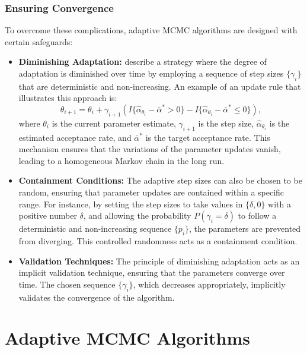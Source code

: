 \documentclass{article}
\begin{document}
\subsubsection{Ensuring Convergence}
To overcome these complications, adaptive MCMC algorithms are designed with certain safeguards:
\begin{itemize}
\item \textbf{Diminishing Adaptation:} \cite{andrieu_tutorial_2008} describe a strategy where the degree of adaptation is diminished over time by employing a sequence of step sizes \(\{ \gamma_i \}\) that are deterministic and non-increasing. An example of an update rule that illustrates this approach is:
\begin{equation*}
    \theta_{i+1} = \theta_{i} + \gamma_{i+1} \left( I\{\hat{\alpha}_{\theta_i} - \bar{\alpha}^* > 0\} - I\{\hat{\alpha}_{\theta_i} - \bar{\alpha}^* \leq 0\} \right),
\end{equation*}
where \(\theta_i\) is the current parameter estimate, \(\gamma_{i+1}\) is the step size, \(\hat{\alpha}_{\theta_i}\) is the estimated acceptance rate, and \(\bar{\alpha}^*\) is the target acceptance rate. This mechanism ensures that the variations of the parameter updates vanish, leading to a homogeneous Markov chain in the long run.

\item \textbf{Containment Conditions:} The adaptive step sizes can also be chosen to be random, ensuring that parameter updates are contained within a specific range. For instance, by setting the step sizes to take values in \(\{\delta, 0\}\) with a positive number \(\delta\), and allowing the probability \(P(\gamma_i = \delta)\) to follow a deterministic and non-increasing sequence \(\{p_i\}\), the parameters are prevented from diverging. This controlled randomness acts as a containment condition.

\item \textbf{Validation Techniques:} The principle of diminishing adaptation acts as an implicit validation technique, ensuring that the parameters converge over time. The chosen sequence \(\{\gamma_i\}\), which decreases appropriately, implicitly validates the convergence of the algorithm.
\end{itemize}

\section{Adaptive MCMC Algorithms}
\end{document}
